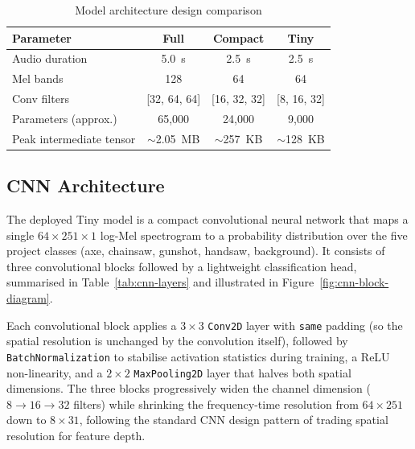 \begin{table}[H]
    \centering
    \caption{Model architecture design comparison}
    \label{tab:model-evolution}
    \begin{tabular}{lccc}
        \toprule
        \textbf{Parameter} & \textbf{Full} & \textbf{Compact} & \textbf{Tiny} \\
        \midrule
        Audio duration      & 5.0~s          & 2.5~s          & 2.5~s \\
        Mel bands           & 128            & 64             & 64 \\
        Conv filters        & [32, 64, 64]   & [16, 32, 32]   & [8, 16, 32] \\
        Parameters (approx.)& 65{,}000       & 24{,}000       & 9{,}000 \\
        Peak intermediate tensor & $\sim$2.05~MB & $\sim$257~KB & $\sim$128~KB \\
        \bottomrule
    \end{tabular}
\end{table}

\subsection{CNN Architecture}
\label{subsec:cnn-architecture}

The deployed Tiny model is a compact convolutional neural network that
maps a single $64 \times 251 \times 1$ log-Mel spectrogram to a probability
distribution over the five project classes (axe, chainsaw, gunshot,
handsaw, background). It consists of three convolutional blocks followed
by a lightweight classification head, summarised in
Table~\ref{tab:cnn-layers} and illustrated in
Figure~\ref{fig:cnn-block-diagram}.

Each convolutional block applies a $3\times3$ \texttt{Conv2D} layer with
\texttt{same} padding (so the spatial resolution is unchanged by the
convolution itself), followed by \texttt{BatchNormalization} to stabilise
activation statistics during training, a ReLU non-linearity, and a
$2\times2$ \texttt{MaxPooling2D} layer that halves both spatial dimensions.
The three blocks progressively widen the channel dimension
($8 \rightarrow 16 \rightarrow 32$ filters) while shrinking the
frequency-time resolution from $64\times251$ down to $8\times31$, following
the standard CNN design pattern of trading spatial resolution for feature
depth.

